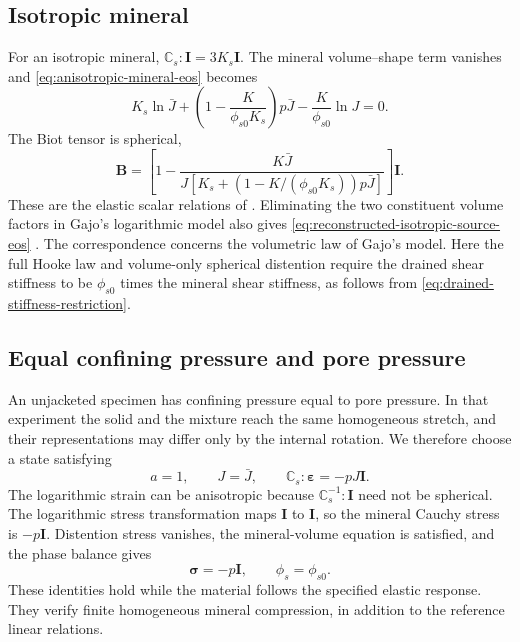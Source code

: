 \subsection{Isotropic mineral}
For an isotropic mineral,
\(\mathbb{C}_s:\mathbf I=3K_s\mathbf I\). The mineral volume--shape
term vanishes and \eqref{eq:anisotropic-mineral-eos} becomes
\begin{equation}
 K_s\ln\bar J+\left(1-\frac{K}{\phi_{s0}K_s}\right)p\bar J
                   -\frac{K}{\phi_{s0}}\ln J=0.
 \label{eq:reconstructed-isotropic-source-eos}
\end{equation}
The Biot tensor is spherical,
\begin{equation}
 \mathbf B=\left[1-\frac{K\bar J}
 {J\left[K_s+\left(1-K/(\phi_{s0}K_s)\right)p\bar J\right]}\right]
 \mathbf I.
 \label{eq:reconstructed-isotropic-source-biot}
\end{equation}
These are the elastic scalar relations of \citet{foster2026poroplastic}.
Eliminating the two constituent volume factors in Gajo's logarithmic model
also gives \eqref{eq:reconstructed-isotropic-source-eos}
\citep[eqs.~(3.27), (3.32), and (3.34)]{gajo2010}. The correspondence concerns
the volumetric law of Gajo's model. Here the full Hooke law and volume-only spherical distention
require the drained shear stiffness to be \(\phi_{s0}\) times the mineral
shear stiffness, as follows from \eqref{eq:drained-stiffness-restriction}.

\subsection{Equal confining pressure and pore pressure}
An unjacketed specimen has confining pressure equal to pore pressure. In
that experiment the solid and the mixture reach the same homogeneous
stretch, and their representations may differ only by the internal rotation.
We therefore choose a state satisfying
\begin{equation}
 a=1,\qquad J=\bar J,\qquad
 \mathbb{C}_s:\mathbf\varepsilon=-pJ\mathbf I.
 \label{eq:reconstructed-finite-unjacketed-path}
\end{equation}
The logarithmic strain can be anisotropic because \(\mathbb{C}_s^{-1}:\mathbf I\)
need not be spherical. The logarithmic stress transformation maps
\(\mathbf I\) to \(\mathbf I\), so the mineral Cauchy stress is
\(-p\mathbf I\). Distention stress vanishes, the mineral-volume equation
is satisfied, and the phase balance gives
\begin{equation}
 \mathbf\sigma=-p\mathbf I,\qquad \phi_s=\phi_{s0}.
 \label{eq:finite-unjacketed-stress-fraction}
\end{equation}
These identities hold while the material follows the specified elastic
response. They verify finite homogeneous mineral compression, in addition
to the reference linear relations.
